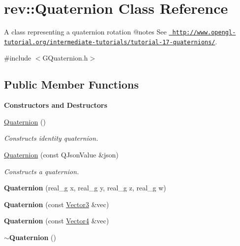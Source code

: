 \hypertarget{classrev_1_1_quaternion}{}\section{rev\+::Quaternion Class Reference}
\label{classrev_1_1_quaternion}


A class representing a quaternion rotation @notes See \href{http://www.opengl-tutorial.org/intermediate-tutorials/tutorial-17-quaternions/}{\texttt{ http\+://www.\+opengl-\/tutorial.\+org/intermediate-\/tutorials/tutorial-\/17-\/quaternions/}}.  




{\ttfamily \#include $<$G\+Quaternion.\+h$>$}

\subsection*{Public Member Functions}
\begin{Indent}\textbf{ Constructors and Destructors}\par
\begin{DoxyCompactItemize}
\item 
\mbox{\label{classrev_1_1_quaternion_adf8856d4daed78692ecda6e900620fa2}} 
\mbox{\hyperlink{classrev_1_1_quaternion_adf8856d4daed78692ecda6e900620fa2}{Quaternion}} ()
\begin{DoxyCompactList}\small\item\em Constructs identity quaternion. \end{DoxyCompactList}\item 
\mbox{\label{classrev_1_1_quaternion_a2b9172c95dbf4b89662fe0c295841f13}} 
\mbox{\hyperlink{classrev_1_1_quaternion_a2b9172c95dbf4b89662fe0c295841f13}{Quaternion}} (const Q\+Json\+Value \&json)
\begin{DoxyCompactList}\small\item\em Constructs a quaternion. \end{DoxyCompactList}\item 
\mbox{\label{classrev_1_1_quaternion_a04f023c8d9a64fa7fdee9097bba22de2}} 
{\bfseries Quaternion} (real\+\_\+g x, real\+\_\+g y, real\+\_\+g z, real\+\_\+g w)
\item 
\mbox{\label{classrev_1_1_quaternion_a29cc208a1b796a34c638de54a1ebe633}} 
{\bfseries Quaternion} (const \mbox{\hyperlink{classrev_1_1_vector}{Vector3}} \&vec)
\item 
\mbox{\label{classrev_1_1_quaternion_a0e3c2722216a89511c05555fccc1aa29}} 
{\bfseries Quaternion} (const \mbox{\hyperlink{classrev_1_1_vector}{Vector4}} \&vec)
\item 
\mbox{\label{classrev_1_1_quaternion_abd5e5c81772330815ce5c1b0a70e3cdd}} 
{\bfseries $\sim$\+Quaternion} ()
\end{DoxyCompactItemize}
\end{Indent}
